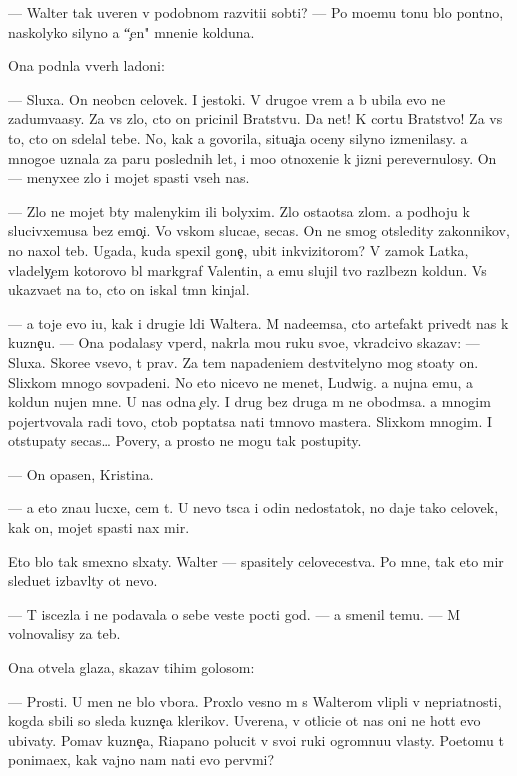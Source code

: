 \documentclass[10pt]{book}
\begin{document}
— Walter tak uveren v podobnom razviti{\y}i sob{\yi}ti{\y}? — Po mo{\y}emu tonu b{\yi}lo pon{\ia}tno, naskolyko silyno {\y}a ``{\c}en{\io}" mneni{\y}e kolduna.

Ona podn{\ia}la vverh ladoni:

— Sluxa{\y}. On neob{\yi}cn{\yi}{\y} celovek. I jestoki{\y}. V drugo{\y}e vrem{\ia} {\y}a b{\yi} ubila {\y}evo ne zadum{\yi}va{\y}asy. Za vs{\e} zlo, cto on pricinil Bratstvu. Da net! K cortu Bratstvo! Za vs{\e} to, cto on sdelal tebe. No, kak {\y}a govorila, situa{\c}i{\y}a oceny silyno izmenilasy. {\Y}a mnogo{\y}e uznala za paru poslednih let, i mo{\y}o otnoxeni{\y}e k jizni perevernulosy. On — menyxe{\y}e zlo i mojet spasti vseh nas.

— Zlo ne mojet b{\yi}ty malenykim ili bolyxim. Zlo osta{\y}otsa zlom. {\Y}a podhoju k slucivxemusa bez emo{\c}i{\y}. Vo vs{\ia}kom sluca{\y}e, se{\y}cas. On ne smog otsledity zakonnikov, no naxol teb{\ia}. Ugada{\y}, kuda spexil gone{\c}, ubit{\yi}{\y} inkvizitorom? V zamok Latka, vladely{\c}em kotorovo b{\yi}l markgraf Valentin, a {\y}emu slujil tvo{\y} razl{\io}bezn{\yi}{\y} koldun. Vs{\e} ukaz{\yi}va{\y}et na to, cto on iskal t{\e}mn{\yi}{\y} kinjal.

— {\Y}a toje {\y}evo i{\x}u, kak i drugi{\y}e l{\io}di Waltera. M{\yi} nade{\y}emsa, cto artefakt prived{\e}t nas k kuzne{\c}u. — Ona podalasy vper{\e}d, nakr{\yi}la mo{\y}u ruku svo{\y}e{\y}, vkradcivo skazav: — Sluxa{\y}. Skore{\y}e vsevo, t{\yi} prav. Za tem napadeni{\y}em de{\y}stvitelyno mog sto{\y}aty on. Slixkom mnogo sovpadeni{\y}. No eto nicevo ne men{\ia}{\y}et, Ludwig. {\Y}a nujna {\y}emu, a koldun nujen mne. U nas odna {\c}ely. I drug bez druga m{\yi} ne obo{\y}d{\e}msa. {\Y}a mnogim pojertvovala radi tovo, ctob{\yi} pop{\yi}tatsa na{\y}ti t{\e}mnovo mastera. Slixkom mnogim. I otstupaty se{\y}cas… Povery, {\y}a prosto ne mogu tak postupity.

— On opasen, Kristina.

— {\Y}a eto zna{\y}u lucxe, cem t{\yi}. U nevo t{\yi}s{\ia}ca i odin nedostatok, no daje tako{\y} celovek, kak on, mojet spasti nax mir.

Eto b{\yi}lo tak smexno sl{\yi}xaty. Walter — spasitely celovecestva. Po mne, tak eto mir sledu{\y}et izbavl{\ia}ty ot nevo.

— T{\yi} iscezla i ne podavala o sebe veste{\y} pocti god. — {\Y}a smenil temu. — M{\yi} volnovalisy za teb{\ia}.

Ona otvela glaza, skazav tihim golosom:

— Prosti. U men{\ia} ne b{\yi}lo v{\yi}bora. Proxlo{\y} vesno{\y} m{\yi} s Walterom vlipli v nepri\-{\y}at\-nosti, kogda sbili so sleda kuzne{\c}a klerikov. Uve\-re\-na, v otlici{\y}e ot nas oni ne hot{\ia}t {\y}evo ubivaty. Po{\y}mav kuzne{\c}a, Riapano polucit v svo{\y}i ruki ogromnu{\y}u vlas\-ty. Poetomu t{\yi} ponima{\y}ex, kak vajno nam na{\y}ti {\y}evo perv{\yi}mi?
\end{document}
